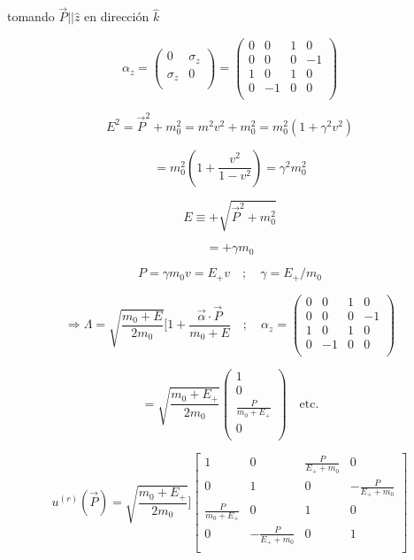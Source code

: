 \documentclass{report}
\begin{document}
tomando $\overrightarrow{P} || \hat{z}$ en dirección $\hat{k}$

\[\alpha_{z} = \left ( \begin{array}{cc}
 0 & \sigma_{z}   \\
 \sigma_{z} & 0  \\
 \end{array} \right) = \left ( \begin{array}{cccc}
 0 & 0 & 1 & 0  \\
 0 & 0 & 0 & -1 \\
 1 & 0 & 1 & 0 \\
 0 & -1 & 0 & 0 \\
 \end{array} \right)
 \]

\[E^2 = \overrightarrow{P}^2 + m_{0}^{2} = m^2 v^2 + m_{0}^2 = m_{0}^{2}(1+ \gamma^{2} v^{2})\]

\[= m_{0}^{2} (1+ \frac{v^{2}}{1-v^2}) = \gamma^{2} m_{0}^2\]

\[E \equiv + \sqrt{\overrightarrow{P}^2 + m_{0}^{2}}\]

\[= + \gamma m_0\]

\[P = \gamma m_0 v = E_{+} v \quad ; \quad \gamma= E_{+}/m_0\]

\[\Rightarrow \Lambda = \sqrt{\frac{m_0 +E}{2m_0}}[1+ \frac{\overrightarrow{\alpha} \cdot \overrightarrow{P}}{m_0 + E} \quad ; \quad \alpha_{z} = \left ( \begin{array}{cccc}
 0 & 0 & 1 & 0  \\
 0 & 0 & 0 & -1 \\
 1 & 0 & 1 & 0 \\
 0 & -1 & 0 & 0 \\
 \end{array} \right)\]

\[= \sqrt{\frac{m_{0} + E_{+}}{2m_0}} \left ( \begin{array}{cccc}
 1   \\
 0   \\
 \frac{P}{m_{0}+E_{+}}   \\
 0   \\
 \end{array} \right) \quad \text{etc.}\]

\[u^{(r)}(\overrightarrow{P}) = \sqrt{\frac{m_{0} + E_{+}}{2m_{0}}} ]\left[ \begin{array}{cccc}
 1 & 0 & \frac{P}{E_{+}+m_0} & 0  \\
 0 & 1 & 0 & -\frac{P}{E_{+}+m_0} \\
 \frac{P}{m_0 + E_{+}} & 0 & 1 & 0 \\
 0 & -\frac{P}{E_{+}+m_0} & 0 & 1 \\
 \end{array} \right] \]
\end{document}
